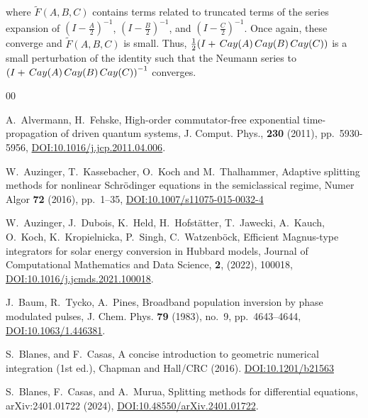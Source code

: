 \documentclass{article}
\newcommand{\Cay}{\,{\rm Cay}}
\begin{document}
%
where $\widetilde F(A,B,C)$ contains terms related to truncated terms of the series expansion of $(I- \frac A2)^{-1}$, $(I- \frac B2)^{-1}$, and $(I- \frac C2)^{-1}$. Once again, these converge and $\widetilde F(A,B,C)$ is small. Thus, $\frac 12 (I + \Cay(A) \Cay(B) \Cay(C))$ is a small perturbation of the identity such that the Neumann series to $\left( I + \Cay(A) \Cay(B) \Cay(C)\right)^{-1}$ converges.





\begin{thebibliography}{00}

A.~Alvermann, H.~Fehske,
\newblock High-order commutator-free exponential time-propagation of driven quantum systems,
\newblock J. Comput. Phys., \textbf{230} (2011),
pp.~5930-5956,
\href{https://api.semanticscholar.org/CorpusID:35139068}{DOI:10.1016/j.jcp.2011.04.006}.


W.~Auzinger, T.~Kassebacher, O.~Koch and M.~Thalhammer,
\newblock Adaptive splitting methods for nonlinear Schrödinger equations in the semiclassical regime,
\newblock Numer Algor \textbf{72} (2016), pp.~1–35, \href{https://doi.org/10.1007/s11075-015-0032-4}{DOI:10.1007/s11075-015-0032-4}


W.~Auzinger, J.~Dubois, K.~Held, H.~Hofstätter, T.~Jawecki, A.~Kauch, O.~Koch, K.~Kropielnicka, P.~Singh, C.~Watzenböck,
\newblock Efficient Magnus-type integrators for solar energy conversion in Hubbard models,
\newblock Journal of Computational Mathematics and Data Science, \textbf{2},
(2022), 100018, \href{https://doi.org/10.1016/j.jcmds.2021.100018}{DOI:10.1016/j.jcmds.2021.100018}.

J.~Baum, R.~Tycko, A.~Pines,
\newblock Broadband population inversion by phase modulated
pulses, 
\newblock J. Chem. Phys. \textbf{79} (1983), no.~9, pp.~4643–4644,
\href{https://doi.org/10.1063/1.446381}{DOI:10.1063/1.446381}.


S.~Blanes, and F.~Casas, 
\newblock A concise introduction to geometric numerical integration (1st ed.), 
\newblock Chapman and Hall/CRC (2016). \href{https://doi.org/10.1201/b21563}{DOI:10.1201/b21563}


S.~Blanes, F.~Casas, and A.~Murua,
\newblock Splitting methods for differential equations, \newblock arXiv:2401.01722 (2024), \href{https://doi.org/10.48550/arXiv.2401.01722}{DOI:10.48550/arXiv.2401.01722}.



\end{thebibliography}
\end{document}
